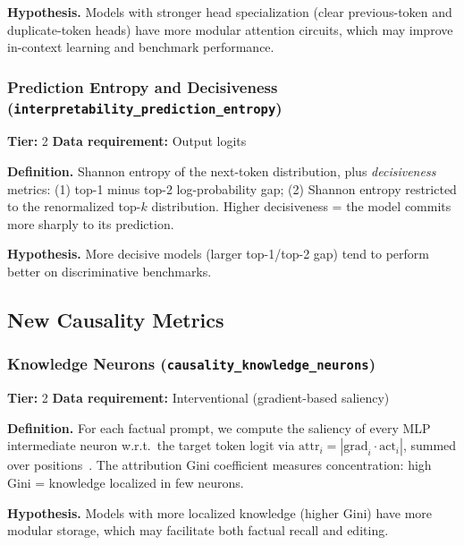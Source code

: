 \documentclass{article}
\begin{document}
\textbf{Hypothesis.} Models with stronger head specialization (clear previous-token and duplicate-token heads) have more modular attention circuits, which may improve in-context learning and benchmark performance.

\subsubsection{Prediction Entropy and Decisiveness (\texttt{interpretability\_prediction\_entropy})}
\label{app:pred-entropy}

\textbf{Tier:} 2 \quad \textbf{Data requirement:} Output logits

\textbf{Definition.} Shannon entropy of the next-token distribution, plus \emph{decisiveness} metrics: (1) top-1 minus top-2 log-probability gap; (2) Shannon entropy restricted to the renormalized top-$k$ distribution. Higher decisiveness = the model commits more sharply to its prediction.

\textbf{Hypothesis.} More decisive models (larger top-1/top-2 gap) tend to perform better on discriminative benchmarks.

\subsection{New Causality Metrics}
\label{app:new-causality}

\subsubsection{Knowledge Neurons (\texttt{causality\_knowledge\_neurons})}
\label{app:knowledge-neurons}

\textbf{Tier:} 2 \quad \textbf{Data requirement:} Interventional (gradient-based saliency)

\textbf{Definition.} For each factual prompt, we compute the saliency of every MLP intermediate neuron w.r.t.\ the target token logit via $\text{attr}_i = |\text{grad}_i \cdot \text{act}_i|$, summed over positions~\citep{dai2022knowledge}. The attribution Gini coefficient measures concentration: high Gini = knowledge localized in few neurons.

\textbf{Hypothesis.} Models with more localized knowledge (higher Gini) have more modular storage, which may facilitate both factual recall and editing.
\end{document}

